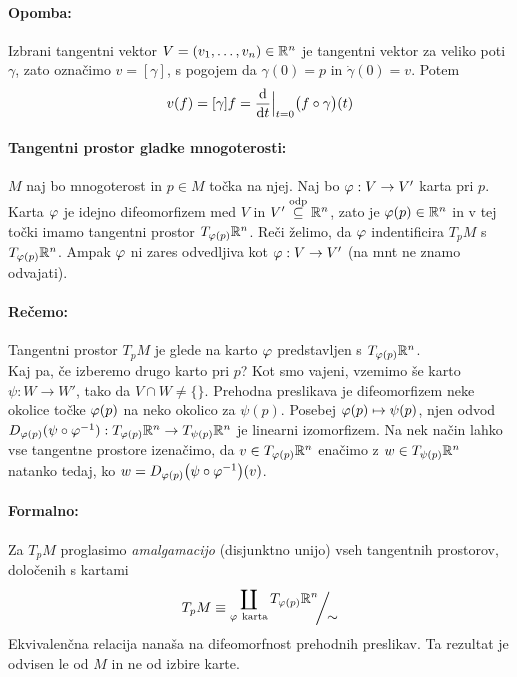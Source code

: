 \paragraph{Opomba:} Izbrani tangentni vektor $V = (v_1, \ldots, v_n) \in \mathbb{R}^n$ je tangentni vektor za veliko poti $\gamma$, zato
ozna\v cimo $v = [\gamma]$, s pogojem da $\gamma(0) = p$ in $\dot{\gamma}(0) = v$. Potem
\[
	v(f) = [\gamma]f = \frac{\text{d}}{\text{d} t}\Big|_{t = 0} \big(f \circ \gamma\big) (t)
\]

\begin{defin}
	\paragraph{Tangentni prostor gladke mnogoterosti:}
	$M$ naj bo mnogoterost in $p \in M$ to\v cka na njej. Naj bo $\varphi : V \to V'$ karta pri $p$. Karta $\varphi$ je idejno
	difeomorfizem med $V$ in $V' \stackrel{\text{odp}}{\subseteq} \mathbb{R}^n$, zato je $\varphi(p) \in \mathbb{R}^n$ in v tej to\v cki imamo tangentni prostor $T_{\varphi(p)}\mathbb{R}^n$.
	Re\v ci \v zelimo, da $\varphi$ indentificira $T_pM$ s $T_{\varphi(p)}\mathbb{R}^n$. Ampak $\varphi$ ni zares odvedljiva kot $\varphi : V \to V'$
	(na mnt ne znamo odvajati).

	\paragraph{Re\v cemo:} Tangentni prostor $T_pM$ je glede na karto $\varphi$ predstavljen s $T_{\varphi(p)}\mathbb{R}^n$.\\[6pt]
	
	Kaj pa, \v ce izberemo drugo karto pri $p$? Kot smo vajeni, vzemimo \v se karto $\psi : W \to W'$, tako da $V \cap W \neq \{\}$.
	Prehodna preslikava je difeomorfizem neke okolice to\v cke $\varphi(p)$ na neko okolico za $\psi(p)$. Posebej
	$\varphi(p) \mapsto \psi(p)$, njen odvod $D_{\varphi(p)}(\psi \circ \varphi^{-1}) : T_{\varphi(p)}\mathbb{R}^n \to T_{\psi(p)} \mathbb{R}^n$ je
	linearni izomorfizem. Na nek na\v cin lahko vse tangentne prostore izena\v cimo, da $v \in T_{\varphi(p)}\mathbb{R}^n$ ena\v cimo z
	$w \in T_{\psi(p)}\mathbb{R}^n$ natanko tedaj, ko $w = D_{\varphi(p)}\big(\psi \circ \varphi^{-1}\big)(v)$.

	\paragraph{Formalno:}
	Za $T_pM$ proglasimo \emph{amalgamacijo} (disjunktno unijo) vseh tangentnih prostorov, dolo\v cenih s kartami
	\[
		T_pM \equiv \bquot{\coprod_{\vfi\ \text{karta}} T_{\vfi(p)}\R^n}{\sim}
	\]
	Ekvivalen\v cna relacija nana\v sa na difeomorfnost prehodnih preslikav. Ta rezultat je odvisen le od $M$ in ne od
	izbire karte.
\end{defin}

